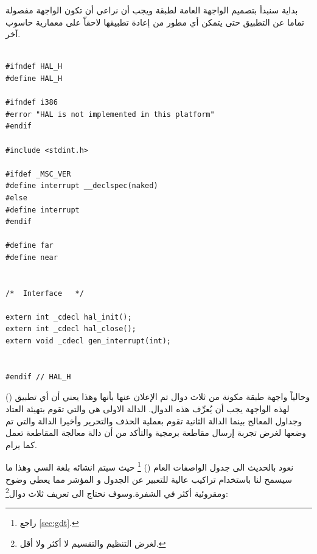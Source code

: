 \documentclass[document.tex]{subfiles}
\begin{document}
بداية سنبدأ بتصميم الواجهة العامة لطبقة  ويجب أن نراعي أن تكون الواجهة مفصولة تماما عن التطبيق حتى يتمكن أي مطور من إعادة تطبيقها لاحقاّ على معمارية حاسوب آخر.


\begin{english}

\lstset{numberstyle=\tiny,numbersep=5pt,tabsize=2,extendedchars=true,breaklines=true,frame=b,showspaces=false, showtabs=false,xleftmargin=10pt,framexleftmargin=10pt,framexrightmargin=5pt,framexbottommargin=4pt,showstringspaces=false,language=C++}

\begin{lstlisting}[label=hal_interface,caption=\en{include/hal.h:Hardware Abstraction Layer Interface}]

#ifndef HAL_H
#define HAL_H

#ifndef i386
#error "HAL is not implemented in this platform"
#endif

#include <stdint.h>

#ifdef _MSC_VER
#define interrupt __declspec(naked)
#else
#define interrupt
#endif

#define far
#define near


/*	Interface	*/

extern int _cdecl hal_init();
extern int _cdecl hal_close();
extern void _cdecl gen_interrupt(int);


#endif // HAL_H
\end{lstlisting}
\end{english}

وحالياً واجهة طبقة  مكونة من ثلاث دوال تم الإعلان عنها بأنها  وهذا يعني أن أي تطبيق () لهذه الواجهة يجب أن يُعرِّف هذه الدوال. الدالة الاولى هي  والتي تقوم بتهيئة العتاد وجداول المعالج بينما الدالة الثانية  تقوم بعملية الحذف والتحرير وأخيرا الدالة  والتي تم وضعها لغرض تجربة إرسال مقاطعة برمجية والتأكد من أن دالة معالجة المقاطعة تعمل كما يرام.

نعود بالحديث الى جدول الواصفات العام () \footnote{راجع \ref{sec:gdt}.} حيث سيتم انشائه بلغة السي وهذا ما سيسمح لنا باستخدام تراكيب عالية للتعبير عن الجدول و المؤشر مما يعطي وضوح ومقروئية أكثر في الشفرة.وسوف نحتاج  الى تعريف ثلاث دوال\footnote{لغرض التنظيم والتقسيم لا أكثر ولا أقل.}:
\end{document}
